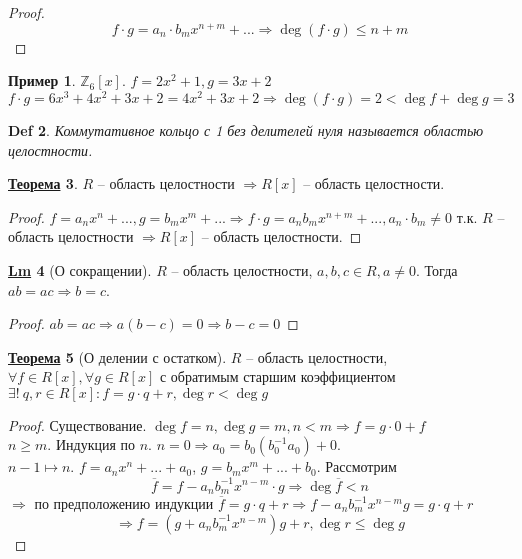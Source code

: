 \documentclass[12pt]{article}
\def\Z{\mathbb{Z}}       %
\def\SO{\Rightarrow}     %
\theoremstyle{definition} %
\newtheorem{Thm}{\underline{Теорема}}[subsection] %
\newtheorem{Lm}[Thm]{\underline{Lm}} %
\newtheorem{Example}[Thm]{Пример} %
\theoremstyle{plain} %
\newtheorem{Def}[Thm]{Def} %
\theoremstyle{remark} %
\begin{document}
{\begin{proof}
    \[f \cdot g = a_n \cdot b_m x^{n + m} + ... \SO \deg (f \cdot g) \leqslant n + m\]
\end{proof}

\begin{Example}
    $\Z_6 [x]$. $f = 2x^2 + 1, g = 3x + 2$ 
    \[f \cdot g = 6x^3 + 4x^2 + 3x + 2 = 4x^2 + 3x + 2 \SO \deg (f \cdot g) = 2 < \deg f + \deg g = 3\]
\end{Example}

\begin{Def}
    Коммутативное кольцо с 1 без делителей нуля называется областью целостности.
\end{Def}

\begin{Thm}
    $R$ -- область целостности $\SO R[x]$ -- область целостности.
\end{Thm}

\begin{proof}
    $f = a_n x^n + ..., g = b_m x^m + ... \SO f \cdot g = a_n b_m x^{n + m} + ..., a_n \cdot b_m \neq 0$ т.к. $R$ -- область целостности
    $\SO R[x]$ -- область целостности. 
\end{proof}

\begin{Lm}[О сокращении]
    $R$ -- область целостности, $a, b, c \in R, a \neq 0$. Тогда $ab = ac \SO b = c$. 
\end{Lm}

\begin{proof}
    $ab = ac \SO a(b - c) = 0 \SO b - c = 0$ 
\end{proof}

\begin{Thm}[О делении с остатком]
    $R$ -- область целостности, $\forall f \in R[x], \forall g \in R[x]$ с обратимым старшим коэффициентом 
    $\exists ! \ q, r \in R[x] : f = g \cdot q + r, \deg r < \deg g$ 
\end{Thm}

\begin{proof}
    Существование. $\deg f = n, \deg g = m, n < m \SO f = g \cdot 0 + f$ \\
    $n \geqslant m$. Индукция по $n$. $n = 0 \SO a_0 = b_0(b_0^{-1} a_0) + 0$. \\
    $n - 1 \mapsto n$. $f = a_n x^n + ... + a_0$, $g = b_m x^m + ... + b_0$. Рассмотрим 
    \[\overline{f} = f - a_n b_m^{-1} x^{n - m} \cdot g \SO \deg \overline{f} < n\]
    $\SO$ по предположению индукции $\overline{f} = g \cdot q + r \SO f - a_n b_m^{-1} x^{n - m} g = g \cdot q + r$ 
    \[\SO f = (g + a_n b_m^{-1} x^{n - m})g + r, \deg r \leqslant \deg g\]


\end{proof}}
\end{document}
